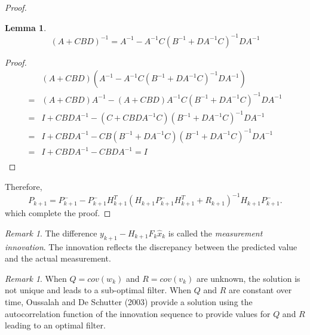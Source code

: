 \documentclass{article}
\newtheorem{lem}[thm]{Lemma}
\theoremstyle{definition}
\theoremstyle{remark}
\newtheorem{remark}[thm]{Remark}
\newcommand{\filtrationObs}[1]{\ensuremath{\mathscr{Y}_{#1}}}
\begin{document}
\begin{proof}
\begin{lem}
\begin{equation*}
(A+CBD)^{-1}=A^{-1}-A^{-1}C(B^{-1}+DA^{-1}C)^{-1}DA^{-1}
\end{equation*}
\end{lem}
\begin{proof}
\begin{align*}
&(A+CBD)(A^{-1}-A^{-1}C(B^{-1}+DA^{-1}C)^{-1}DA^{-1})\\
=&(A+CBD)A^{-1}-(A+CBD)A^{-1}C(B^{-1}+DA^{-1}C)^{-1}DA^{-1}\\
=&I+CBDA^{-1}-(C+CBDA^{-1}C)(B^{-1}+DA^{-1}C)^{-1}DA^{-1}\\
=&I+CBDA^{-1}-CB(B^{-1}+DA^{-1}C)(B^{-1}+DA^{-1}C)^{-1}DA^{-1}\\
=&I+CBDA^{-1}-CBDA^{-1}=I\\
\end{align*}
\end{proof}
Therefore,
\begin{equation*}
P_{k+1}=P^-_{k+1}-P^-_{k+1}H_{k+1}^T(H_{k+1}P^-_{k+1}H_{k+1}^T+R_{k+1})^{-1}H_{k+1}P^-_{k+1}.
\end{equation*}
which complete the proof.
\end{proof}


\begin{remark}
The difference $y_{k+1}-H_{k+1}F_k\hat{x}_k$ is called the \emph{measurement innovation}. The innovation reflects the discrepancy between the predicted value and the actual measurement.
\end{remark}

\begin{remark}
When $Q=cov(w_k)$ and $R=cov(v_k)$ are unknown, the solution is not unique and leads to a sub-optimal filter. When $Q$ and $R$ are constant over time, Oussalah and De Schutter (2003) provide a solution using the autocorrelation function of the innovation sequence to provide values for $Q$ and $R$ leading to an optimal filter.
\end{remark}
\end{document}
